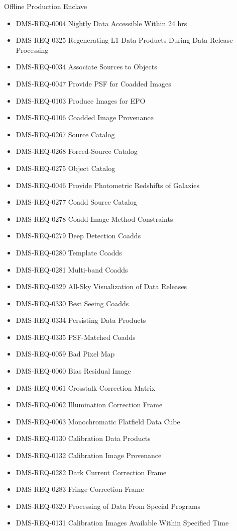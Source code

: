 Offline Production Enclave \begin{itemize}
\item DMS-REQ-0004 Nightly Data Accessible Within 24 hrs
\item DMS-REQ-0325 Regenerating L1 Data Products During Data Release Processing
\item DMS-REQ-0034 Associate Sources to Objects
\item DMS-REQ-0047 Provide PSF for Coadded Images
\item DMS-REQ-0103 Produce Images for EPO
\item DMS-REQ-0106 Coadded Image Provenance
\item DMS-REQ-0267 Source Catalog
\item DMS-REQ-0268 Forced-Source Catalog
\item DMS-REQ-0275 Object Catalog
\item DMS-REQ-0046 Provide Photometric Redshifts of Galaxies
\item DMS-REQ-0277 Coadd Source Catalog
\item DMS-REQ-0278 Coadd Image Method Constraints
\item DMS-REQ-0279 Deep Detection Coadds
\item DMS-REQ-0280 Template Coadds
\item DMS-REQ-0281 Multi-band Coadds
\item DMS-REQ-0329 All-Sky Visualization of Data Releases
\item DMS-REQ-0330 Best Seeing Coadds
\item DMS-REQ-0334 Persisting Data Products
\item DMS-REQ-0335 PSF-Matched Coadds
\item DMS-REQ-0059 Bad Pixel Map
\item DMS-REQ-0060 Bias Residual Image
\item DMS-REQ-0061 Crosstalk Correction Matrix
\item DMS-REQ-0062 Illumination Correction Frame
\item DMS-REQ-0063 Monochromatic Flatfield Data Cube
\item DMS-REQ-0130 Calibration Data Products
\item DMS-REQ-0132 Calibration Image Provenance
\item DMS-REQ-0282 Dark Current Correction Frame
\item DMS-REQ-0283 Fringe Correction Frame
\item DMS-REQ-0320 Processing of Data From Special Programs
\item DMS-REQ-0131 Calibration Images Available Within Specified Time

\end{itemize}
